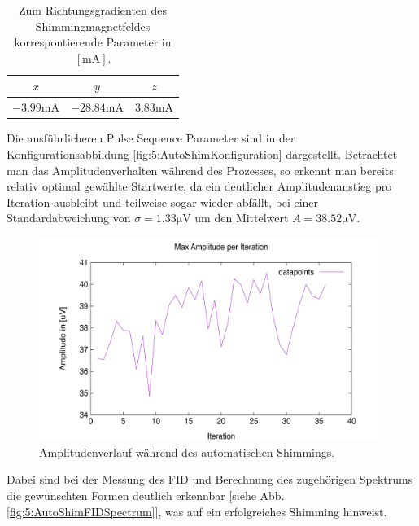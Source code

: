 \documentclass[../../main.tex]{subfiles}
\begin{document}
            \begin{table}[H]
                \centering
                \begin{tabular}{|c|c|c|}
                    \hline
                    $x$ & $y$ & $z$ \\
                    \hline\hline
                    $-3.99\si{\milli\ampere}$ & $-28.84\si{\milli\ampere}$ & $3.83\si{\milli\ampere}$
                    \\\hline
                \end{tabular}
                \caption{Zum Richtungsgradienten des Shimmingmagnetfeldes korrespontierende Parameter in $[\si{\milli\ampere}]$.}
                \label{tab:5:AutoShimParameter}
            \end{table}
            Die ausführlicheren Pulse Sequence Parameter sind in der Konfigurationsabbildung \ref{fig:5:AutoShimKonfiguration} dargestellt. Betrachtet man das Amplitudenverhalten während des Prozesses, so erkennt man bereits relativ optimal gewählte Startwerte, da ein deutlicher Amplitudenanstieg pro Iteration ausbleibt und teilweise sogar wieder abfällt, bei einer Standardabweichung von $\sigma = 1.33\si{\micro\volt}$ um den Mittelwert $\overline A = 38.52\si{\micro\volt}$. 
            \begin{figure}[H]
                \centering
                \includegraphics[width=11cm]{Bilddateien/5/AutoShim2_Iteration.png}
                \caption{Amplitudenverlauf während des automatischen Shimmings.}
                \label{fig:5:AutoShimAmplitudenverlauf}
            \end{figure}
            Dabei sind bei der Messung des FID und Berechnung des zugehörigen Spektrums die gewünschten Formen deutlich erkennbar [siehe Abb. \ref{fig:5:AutoShimFIDSpectrum}], was auf ein erfolgreiches Shimming hinweist.
\end{document}
